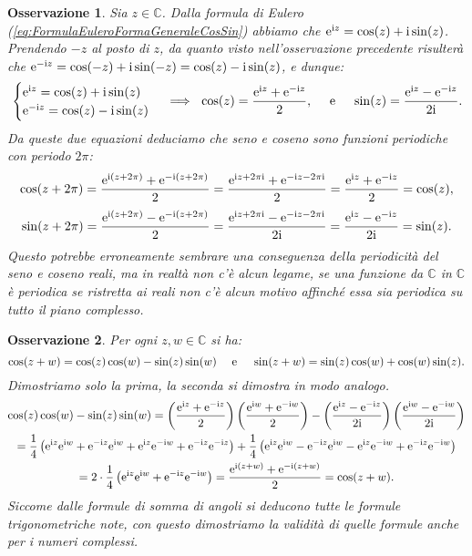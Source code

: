 \documentclass[11pt]{book}
\theoremstyle{Definizione}
\theoremstyle{TeoremaProposizioneLemmaCorollarioCongettura}
\theoremstyle{OsservazioneNotaEsempio}
\newtheorem{myobs}{Osservazione}[section]
\newcommand{\C}{\mathbb{C}}
\renewcommand{\i}{\textup{i}}
\newcommand{\e}{\textup{e}}
\begin{document}
\begin{myobs}
Sia $z\in \C$. Dalla formula di Eulero (\ref{eq:FormulaEuleroFormaGeneraleCosSin}) abbiamo che $\e^{\i z} = \cos(z) + \i\sin(z)$. Prendendo $-z$ al posto di $z$, da quanto visto nell'osservazione precedente risulterà che $\e^{-\i z} = \cos(-z) + \i\sin(-z) = \cos(z)-\i\sin(z)$, e dunque:
$$
\begin{cases}
\e^{\i z} = \cos(z) + \i\sin(z)\\
\e^{-\i z} = \cos(z)-\i\sin(z) 
\end{cases} \implies \ \cos(z) = \frac{\e^{\i z}+\e^{-\i z}}{2},\quad \textup{ e }\quad \sin(z) = \frac{\e^{\i z}-\e^{-\i z}}{2\i}.
$$
Da queste due equazioni deduciamo che seno e coseno sono funzioni periodiche con periodo $2\pi$:
$$
\cos(z+2\pi) = \frac{\e^{\i(z+2\pi)}+\e^{-\i(z+2\pi)}}{2} = \frac{\e^{\i z+2\pi \i}+\e^{-\i z-2\pi \i}}{2} = \frac{\e^{\i z}+\e^{-\i z}}{2} = \cos(z),
$$
$$
\sin(z+2\pi) = \frac{\e^{\i(z+2\pi)}-\e^{-\i(z+2\pi)}}{2} = \frac{\e^{\i z+2\pi \i}-\e^{-\i z-2\pi \i}}{2\i} = \frac{\e^{\i z}-\e^{-\i z}}{2\i} = \sin(z).
$$
Questo potrebbe erroneamente sembrare una conseguenza della periodicità del seno e coseno reali, ma in realtà non c'è alcun legame, se una funzione da $\C$ in $\C$ è periodica se ristretta ai reali non c'è alcun motivo affinché essa sia periodica su tutto il piano complesso.
\end{myobs}
\begin{myobs}
Per ogni $z,w\in \C$ si ha:
$$
\cos(z+w) = \cos(z)\cos(w)-\sin(z)\sin(w)\quad \textup{ e }\quad\sin(z+w) = \sin(z)\cos(w)+\cos(w)\sin(z).
$$
Dimostriamo solo la prima, la seconda si dimostra in modo analogo.
\begin{gather*}
\cos(z)\cos(w)-\sin(z)\sin(w) = \left(\frac{\e^{\i z}+\e^{-\i z}}{2}\right)\left(\frac{\e^{\i w}+\e^{-\i w}}{2}\right) - \left(\frac{\e^{\i z}-\e^{-\i z}}{2\i}\right)\left(\frac{\e^{\i w}-\e^{-\i w}}{2\i}\right)\\
= \frac{1}{4}\left(\e^{\i z}\e^{\i w}+\e^{-\i z}\e^{\i w}+\e^{\i z}\e^{-\i w}+\e^{-\i z}\e^{-\i z}\right)+\frac{1}{4}\left(\e^{\i z}\e^{\i w}-\e^{-\i z}\e^{\i w}-\e^{\i z}\e^{-\i w}+\e^{-\i z}\e^{-\i w}\right)\\
= 2 \cdot \frac{1}{4}\left(\e^{\i z}\e^{\i w}+\e^{-\i z}\e^{-\i w}\right) = \frac{\e^{\i(z+w)}+\e^{-\i(z+w)}}{2} = \cos(z+w).
\end{gather*}
Siccome dalle formule di somma di angoli si deducono tutte le formule trigonometriche note, con questo dimostriamo la validità di quelle formule anche per i numeri complessi.
\end{myobs}
\end{document}
